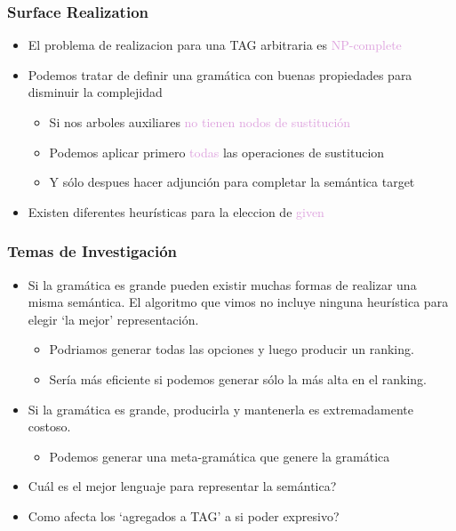 \documentclass[compress,color=usenames]{beamer}
\newcommand{\mH}[1]{\textcolor{Plum}{#1}}
\begin{document}
\begin{frame}
\frametitle{Surface Realization}

\begin{itemize}
\item El problema de realizacion para una TAG arbitraria es \mH{NP-complete}

\item Podemos tratar de definir una gram\'atica con buenas propiedades para 
disminuir la complejidad
\begin{itemize}
\item Si nos arboles auxiliares \mH{no tienen nodos de sustituci\'on}
\item Podemos aplicar primero \mH{todas} las operaciones de sustitucion
\item Y s\'olo despues hacer adjunci\'on para completar la sem\'antica target
\end{itemize}

\item Existen diferentes heur\'isticas para la eleccion de \mH{given}

\end{itemize}

\end{frame}

\begin{frame}
\frametitle{Temas de Investigaci\'on}

\begin{itemize}
\item Si la gram\'atica es grande pueden existir muchas formas de realizar una 
misma sem\'antica.  El algoritmo que vimos no incluye ninguna heur\'istica para 
elegir `la mejor' representaci\'on. 
\begin{itemize}
\item Podriamos generar todas las opciones y luego producir un ranking. 
\item Ser\'ia m\'as eficiente si podemos generar s\'olo la m\'as alta en el ranking.
\end{itemize}

\item Si la gram\'atica es grande, producirla y mantenerla es extremadamente 
costoso. 
\begin{itemize}
\item Podemos generar una meta-gram\'atica que genere la gram\'atica
\end{itemize}

\item Cu\'al es el mejor lenguaje para representar la sem\'antica? 

\item Como afecta los `agregados a TAG' a si poder expresivo?
\end{itemize}
\end{frame}
\end{document}
